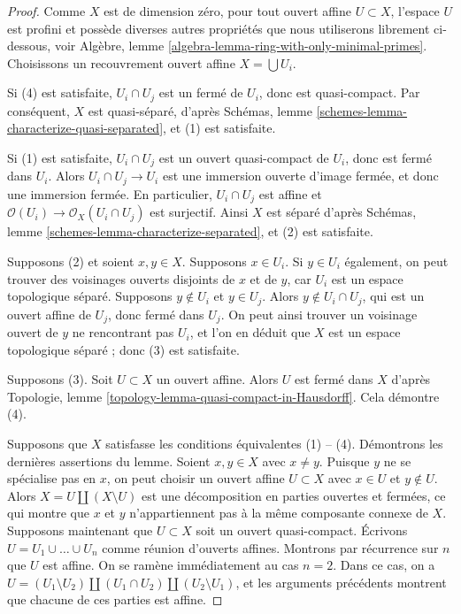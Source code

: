 \begin{proof}
Comme $X$ est de dimension zéro, pour tout ouvert affine
$U \subset X$, l'espace $U$ est profini et possède
diverses autres propriétés que nous utiliserons librement ci-dessous, voir
Algèbre, lemme \ref{algebra-lemma-ring-with-only-minimal-primes}.
Choisissons un recouvrement ouvert affine $X = \bigcup U_i$.

\medskip\noindent
Si (4) est satisfaite, $U_i \cap U_j$ est un fermé de
$U_i$, donc est quasi-compact. Par conséquent, $X$ est quasi-séparé,
d'après Schémas, lemme \ref{schemes-lemma-characterize-quasi-separated},
et (1) est satisfaite.

\medskip\noindent
Si (1) est satisfaite, $U_i \cap U_j$ est un ouvert quasi-compact
de $U_i$, donc est fermé dans $U_i$. Alors $U_i \cap U_j \to U_i$
est une immersion ouverte d'image fermée, et donc une
immersion fermée. En particulier, $U_i \cap U_j$ est affine
et $\mathcal{O}(U_i) \to \mathcal{O}_X(U_i \cap U_j)$ est surjectif.
Ainsi $X$ est séparé
d'après Schémas, lemme \ref{schemes-lemma-characterize-separated},
et (2) est satisfaite.

\medskip\noindent
Supposons (2) et soient $x, y \in X$. Supposons $x \in U_i$. Si $y \in U_i$
également, on peut trouver des voisinages ouverts disjoints de $x$ et de $y$,
car $U_i$ est un espace topologique séparé. Supposons $y \not \in U_i$ et $y \in U_j$.
Alors $y \not \in U_i \cap U_j$, qui est un ouvert affine de $U_j$,
donc fermé dans $U_j$. On peut ainsi trouver un voisinage ouvert
de $y$ ne rencontrant pas $U_i$, et l'on en déduit que $X$ est un espace topologique
séparé ; donc (3) est satisfaite.

\medskip\noindent
Supposons (3). Soit $U \subset X$ un ouvert affine.
Alors $U$ est fermé dans $X$ d'après Topologie, lemme
\ref{topology-lemma-quasi-compact-in-Hausdorff}.
Cela démontre (4).

\medskip\noindent
Supposons que $X$ satisfasse les conditions équivalentes (1) -- (4).
Démontrons les dernières assertions du lemme. Soient $x, y \in X$
avec $x \not = y$. Puisque $y$ ne se spécialise pas en $x$, on peut choisir
un ouvert affine $U \subset X$ avec $x \in U$ et $y \not \in U$.
Alors $X = U \amalg (X \setminus U)$ est une décomposition
en parties ouvertes et fermées, ce qui montre que $x$ et $y$ n'appartiennent
pas à la même composante connexe de $X$. Supposons maintenant que $U \subset X$
soit un ouvert quasi-compact. Écrivons $U = U_1 \cup \ldots \cup U_n$ comme
réunion d'ouverts affines. Montrons par récurrence sur $n$ que $U$ est
affine. On se ramène immédiatement au cas $n = 2$. Dans ce cas, on a
$U = (U_1 \setminus U_2) \amalg (U_1 \cap U_2) \amalg (U_2 \setminus U_1)$,
et les arguments précédents montrent que chacune de ces parties est affine.
\end{proof}

